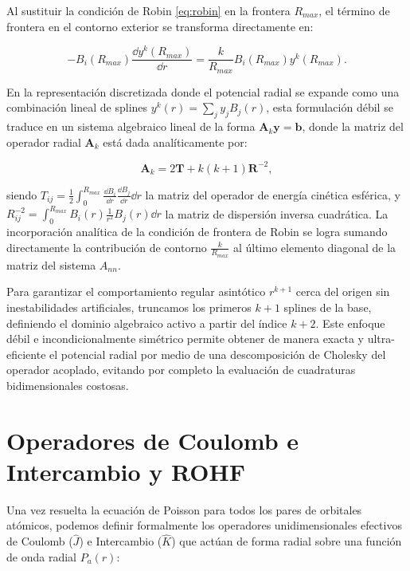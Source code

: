 Al sustituir la condición de Robin \eqref{eq:robin} en la frontera \( R_{max} \), el término de frontera en el contorno exterior se transforma directamente en:

\begin{equation}
  - B_i(R_{max}) \frac{\dd{y^k(R_{max})}}{\dd{r}} = \frac{k}{R_{max}} B_i(R_{max}) y^k(R_{max}).
\end{equation}

En la representación discretizada donde el potencial radial se expande como una combinación lineal de splines \( y^k(r) = \sum_j y_j B_j(r) \), esta formulación débil se traduce en un sistema algebraico lineal de la forma \( \bm{A}_k \bm{y} = \bm{b} \), donde la matriz del operador radial \( \bm{A}_k \) está dada analíticamente por:

\begin{equation}
  \bm{A}_k = 2 \bm{T} + k(k+1) \bm{R}^{-2},
\end{equation}

siendo \( T_{ij} = \frac{1}{2} \int_0^{R_{max}} \frac{\dd{B_i}}{\dd{r}} \frac{\dd{B_j}}{\dd{r}} \dd{r} \) la matriz del operador de energía cinética esférica, y \( R^{-2}_{ij} = \int_0^{R_{max}} B_i(r) \frac{1}{r^2} B_j(r) \dd{r} \) la matriz de dispersión inversa cuadrática. La incorporación analítica de la condición de frontera de Robin se logra sumando directamente la contribución de contorno \( \frac{k}{R_{max}} \) al último elemento diagonal de la matriz del sistema \( A_{nn} \). 

Para garantizar el comportamiento regular asintótico \( r^{k+1} \) cerca del origen sin inestabilidades artificiales, truncamos los primeros \( k+1 \) splines de la base, definiendo el dominio algebraico activo a partir del índice \( k+2 \). Este enfoque débil e incondicionalmente simétrico permite obtener de manera exacta y ultra-eficiente el potencial radial por medio de una descomposición de Cholesky del operador acoplado, evitando por completo la evaluación de cuadraturas bidimensionales costosas.

\section{Operadores de Coulomb e Intercambio y ROHF}

Una vez resuelta la ecuación de Poisson para todos los pares de orbitales atómicos, podemos definir formalmente los operadores unidimensionales efectivos de Coulomb (\( \hat{J} \)) e Intercambio (\( \hat{K} \)) que actúan de forma radial sobre una función de onda radial \( P_a(r) \):

